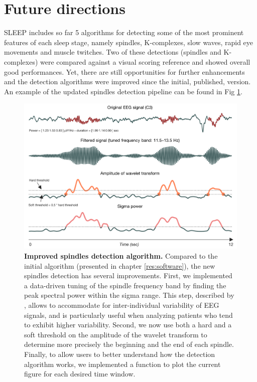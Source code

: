 \section{Future directions}
\label{disc:methods:future}

SLEEP includes so far 5 algorithms for detecting some of the most prominent features of each sleep stage, namely spindles, K-complexes, slow waves, rapid eye movements and muscle twitches. Two of these detections (spindles and K-complexes) were compared against a visual scoring reference and showed overall good performances. Yet, there are still opportunities for further enhancements and the detection algorithms were improved since the initial, published, version. An example of the updated spindles detection pipeline can be found in Fig \ref{fig:disc:methods:future:spindles}.

\begin{figure}[htb]
	\includegraphics[width=\textwidth]{Fig/Discussion/spindles.png}
	\caption[Improved spindles detection algorithm]{\textbf{Improved spindles detection algorithm.} Compared to the initial algorithm (presented in chapter \ref{res:software}), the new spindles detection has several improvements. First, we implemented a data-driven tuning of the spindle frequency band by finding the peak spectral power within the sigma range. This step, described by \citet{berthomier_automatic_2007}, allows to accommodate for inter-individual variability of EEG signals, and is particularly useful when analyzing patients who tend to exhibit higher variability. Second, we now use both a hard and a soft threshold on the amplitude of the wavelet transform to determine more precisely the beginning and the end of each spindle. Finally, to allow users to better understand how the detection algorithm works, we implemented a function to plot the current figure for each desired time window.}
	\label{fig:disc:methods:future:spindles}
\end{figure}

